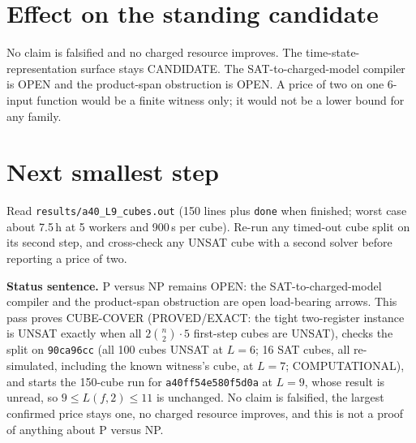 \documentclass[11pt]{article}
\begin{document}
\section*{Effect on the standing candidate}
No claim is falsified and no charged resource improves. The time-state-representation surface stays CANDIDATE. The SAT-to-charged-model compiler is OPEN and the product-span obstruction is OPEN. A price of two on one 6-input function would be a finite witness only; it would not be a lower bound for any family.

\section*{Next smallest step}
Read \texttt{results/a40\_L9\_cubes.out} (150 lines plus \texttt{done} when finished; worst case about 7.5\,h at 5 workers and 900\,s per cube). Re-run any timed-out cube split on its second step, and cross-check any UNSAT cube with a second solver before reporting a price of two.

\bigskip
\noindent\textbf{Status sentence.} P versus NP remains OPEN: the SAT-to-charged-model compiler and the product-span obstruction are open load-bearing arrows. This pass proves CUBE-COVER (PROVED/EXACT: the tight two-register instance is UNSAT exactly when all $2\binom{n}{2}\cdot5$ first-step cubes are UNSAT), checks the split on \texttt{90ca96cc} (all 100 cubes UNSAT at $L=6$; 16 SAT cubes, all re-simulated, including the known witness's cube, at $L=7$; COMPUTATIONAL), and starts the 150-cube run for \texttt{a40ff54e580f5d0a} at $L=9$, whose result is unread, so $9\le L(f,2)\le 11$ is unchanged. No claim is falsified, the largest confirmed price stays one, no charged resource improves, and this is not a proof of anything about P versus NP.
\end{document}
